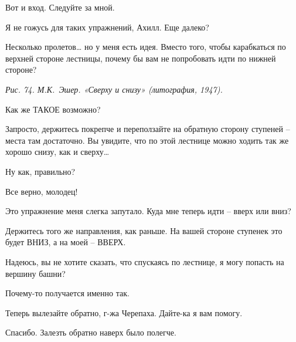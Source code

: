 \documentclass[../main.tex]{subfiles}
\begin{document}
\begin{Dialogue}

 Вот и вход. Следуйте за мной.


 Я не гожусь для таких упражнений, Ахилл. Еще далеко?

 Несколько пролетов\ldots{} но у меня есть идея. Вместо того, чтобы карабкаться по верхней стороне лестницы, почему бы вам не попробовать идти по нижней стороне?

\emph{Рис. 74. М.К.~Эшер. «Сверху и снизу» (литография, 1947).}

 Как же ТАКОЕ возможно?

 Запросто, держитесь покрепче и переползайте на обратную сторону ступеней \--- места там достаточно. Вы увидите, что по этой лестнице можно ходить так же хорошо снизу, как и сверху\ldots{}

 Ну как, правильно?

 Все верно, молодец!

 Это упражнение меня слегка запутало. Куда мне теперь идти \--- вверх или вниз?

 Держитесь того же направления, как раньше. На вашей стороне ступенек это будет ВНИЗ, а на моей \--- ВВЕРХ.

 Надеюсь, вы не хотите сказать, что спускаясь по лестнице, я могу попасть на вершину башни?

 Почему-то получается именно так.


Теперь вылезайте обратно, г-жа Черепаха. Дайте-ка я вам помогу.


 Спасибо. Залезть обратно наверх было полегче.


\end{Dialogue}
\end{document}
